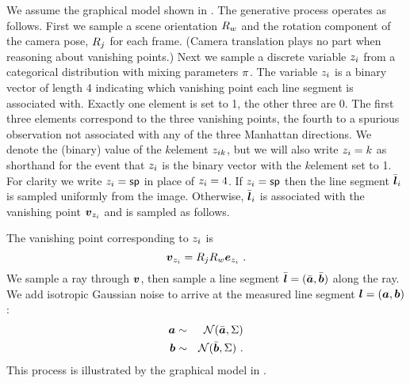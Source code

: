 We assume the graphical model shown in . The
generative process operates as follows. First we sample a scene
orientation $\SceneR$ and the rotation component of the camera pose,
$\CamR_j$ for each frame. (Camera translation plays no part when
reasoning about vanishing points.) Next we sample a discrete variable
$\Indicator_i$ from a categorical distribution with mixing parameters
$\Mixing$. The variable $\Indicator_i$ is a binary vector of length 4
indicating which vanishing point each line segment is associated
with. Exactly one element is set to 1, the other three are 0. The
first three elements correspond to the three vanishing points, the
fourth to a spurious observation not associated
with any of the three Manhattan directions. We denote the (binary)
value of the $k$\th element $\Indicator_{ik}$, but we will also write
$\Indicator_i=k$ as shorthand for the event that $\Indicator_i$ is the
binary vector with the $k$\th element set to 1. For clarity we write
$\Indicator_i=\Spurious$ in place of $\Indicator_i=4$. If
$\Indicator_i=\Spurious$ then the line segment $\TrueSeg_i$ is
sampled uniformly from the image. Otherwise, $\TrueSeg_i$ is
associated with the vanishing point $\vpt_{\Indicator_i}$ and is
sampled as follows.

The vanishing point corresponding to $\Indicator_i$ is
\begin{equation}
  \vpt_{\Indicator_i} = \CamR_j \SceneR \ebasis_{\Indicator_i} ~.
\end{equation}
We sample a ray through $\vpt$, then sample a line segment $\TrueSeg =
(\TrueStartPt,\TrueEndPt)$ along the ray. We add isotropic Gaussian
noise to arrive at the measured line segment
$\LineSeg=(\StartPt,\EndPt)$:
\begin{eqnarray}
  \StartPt &\sim& \NormalDistr(\TrueStartPt, \Sigma) \\
  \EndPt &\sim& \NormalDistr(\TrueEndPt, \Sigma) ~.
\end{eqnarray}
This process is illustrated by the graphical model in .

